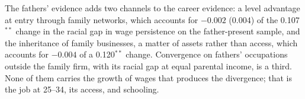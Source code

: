 

The fathers' evidence adds two channels to the career evidence: a level advantage at entry through family networks,
which accounts for $-0.002$ (0.004) of the 0.107$^{**}$ change in the racial gap in wage persistence on the father-present
sample, and the inheritance of family businesses, a matter of assets rather than access, which accounts for $-0.004$ of a
0.120$^{**}$ change. Convergence on fathers' occupations outside the family firm, with its racial gap at equal parental
income, is a third. None of them carries the growth of wages that produces the divergence; that is the job at 25--34,
its access, and schooling.
